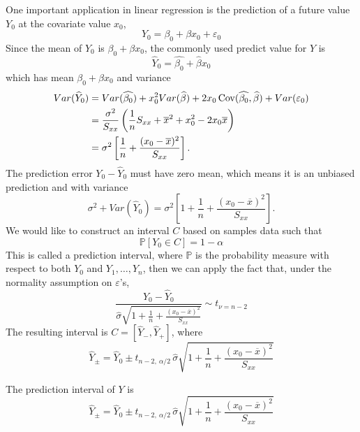 One important application in linear regression is the prediction of a future value 
$Y_0$ at the covariate value $x_0$,
\[
    Y_0 = \beta_0 + \beta x_0 + \varepsilon_0
\]
Since the mean of $Y_0$ is $\beta_0 + \beta x_0$, the commonly used predict value for $Y$ is 
\[
    \widehat{Y}_0 = \widehat{\beta_0} + \widehat{\beta} x_0
\]
which has mean $\beta_0 + \beta x_0$ and variance
\begin{align*}
    Var(\widehat{Y}_0) &= Var(\widehat{\beta_0}) + x^2_0 Var(\widehat{\beta}) + 2x_0 \operatorname*{Cov}({\widehat{\beta_0}, \widehat{\beta}}) + Var(\varepsilon_0)\\
    &= \frac{\sigma^2}{S_{xx}} \left(\frac{1}{n} S_{xx} + \overline{x}^2 + x_0^2 - 2x_0 \overline{x} \right)\\
    &= \sigma^2 \left[\frac{1}{n} + \frac{(x_0 - \overline{x})^2}{S_{xx}}\right].
\end{align*}
The prediction error $Y_0 - \widehat{Y}_0$ must have zero mean, which means it is an unbiased prediction 
and with variance 
\begin{equation}
    \sigma^2 + Var(\widehat{Y}_0) = \sigma^2 \left[1 + \frac{1}{n} + \frac{(x_0 - \overline{x})^2}{S_{xx}}\right].
\end{equation}
We would like to construct an interval $C$ based on samples data such that 
\[
    \mathbb{P}[Y_0 \in C] = 1 - \alpha
\]
This is called a prediction interval, where $\mathbb{P}$ is the probability measure 
with respect to both $Y_0$ and $Y_1, \ldots, Y_n$, then we can apply the fact that, under the 
normality assumption on $\varepsilon$'s, 
\begin{equation}
    \frac{Y_0 - \widehat{Y}_0}{\widehat{\sigma} \sqrt{1 + \frac{1}{n} + \frac{(x_0 - \overline{x})^2}{S_{xx} }} } \sim t_{\nu = n-2}
\end{equation}
The resulting interval is $C = [\widehat{Y}_-, \widehat{Y}_+]$, where
\begin{equation}
    \widehat{Y}_\pm = \widehat{Y}_0 \pm t_{n-2, \> \alpha/2}\, \widehat{\sigma} \sqrt{1 + \frac{1}{n} + \frac{(x_0 - \overline{x})^2}{S_{xx} }}
\end{equation}

\begin{theorem}
    The prediction interval of $Y$ is
    \begin{equation}
        \widehat{Y}_\pm = \widehat{Y}_0 \pm t_{n-2, \> \alpha/2}\, \widehat{\sigma} \sqrt{1 + \frac{1}{n} + \frac{(x_0 - \overline{x})^2}{S_{xx} }}
    \end{equation}
\end{theorem}

